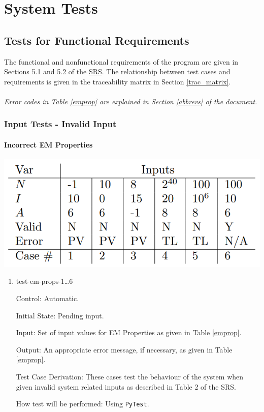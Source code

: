 \documentclass[12pt, titlepage]{article}
\begin{document}
\section{System Tests} \label{sys_tests}

\subsection{Tests for Functional Requirements}
The functional and nonfunctional requirements of the program are given in Sections 5.1 and 5.2 of the \href{https://github.com/husseinsd1/optimal-em-arrangement/blob/main/docs/SRS/SRS.pdf}{SRS}. The relationship between test cases and requirements is given in the traceability matrix in Section \ref{trac_matrix}. \\ \\
\noindent \emph{Error codes in Table \ref{emprop} are explained in Section \ref{abbrevs} of the document.}


\subsubsection{Input Tests - Invalid Input}

		
\paragraph{Incorrect EM Properties}
\begin{center}
  \includegraphics[scale=0.6]{EMInputTable.PNG} \\
  \label{emprop}
\end{center}

\begin{enumerate}

\item{test-em-props-1\dots6\\}

Control: Automatic.
					
Initial State: Pending input.
					
Input: Set of input values for EM Properties as given in Table \ref{emprop}.
					
Output: An appropriate error message, if necessary, as given in Table \ref{emprop}.

Test Case Derivation: These cases test the behaviour of the system when given invalid system related inputs as described in Table 2 of the SRS.
					
How test will be performed: Using \texttt{PyTest}. 
\end{enumerate}
\end{document}
